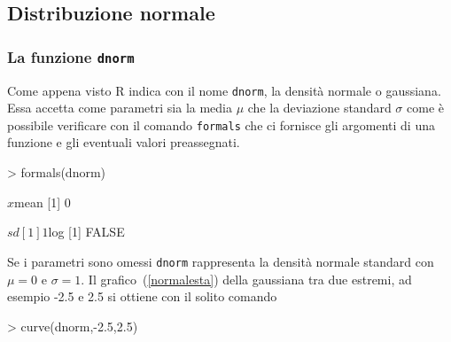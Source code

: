 \documentclass[onecolumn,11pt]{book}
\begin{document}
\subsection{Distribuzione normale}
\subsubsection{La funzione \texttt{dnorm}}
Come appena visto \textsf{R }indica con il nome \texttt{dnorm}, la densit\`a normale o gaussiana. Essa accetta come parametri sia la media $\mu$ che la deviazione standard $\sigma$ come \`e possibile verificare con il comando \texttt{formals} che ci fornisce gli argomenti di una funzione e gli eventuali valori preassegnati.
\begin{Schunk}
\begin{Sinput}
> formals(dnorm)
\end{Sinput}
\begin{Soutput}
$x


$mean
[1] 0

$sd
[1] 1

$log
[1] FALSE
\end{Soutput}
\end{Schunk}
Se i parametri sono omessi \texttt{dnorm} rappresenta la densit\`a normale standard con $\mu=0$ e $\sigma=1$. 
Il grafico~(\ref{normalesta}) della gaussiana
 tra due estremi, ad esempio -2.5 e 2.5 si ottiene con il solito comando
\begin{Schunk}
\begin{Sinput}
> curve(dnorm,-2.5,2.5)
\end{Sinput}
\end{Schunk}
\end{document}
